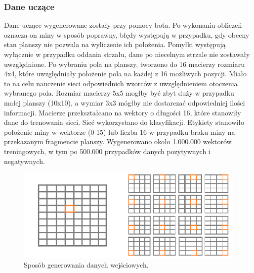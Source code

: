 \documentclass[letterpaper,12pt]{article} %
\begin{document}
\subsubsection*{Dane uczące}
Dane uczące wygenerowane zostały przy pomocy bota. Po wykonaniu obliczeń oznacza on miny w sposób poprawny, błędy występują w przypadku, gdy obecny stan planszy
nie pozwala na wyliczenie ich położenia. Pomyłki występują wyłącznie w przypadku oddania strzału, dane po niecelnym strzale nie zostawały uwzględnione. Po wybraniu pola na planszy, 
tworzono do 16 macierzy rozmiaru 4x4, które uwzględniały położenie pola na każdej z 16 możliwych pozycji. Miało to na celu nauczenie sieci odpowiednich wzorców z uwzględnieniem otoczenia wybranego
pola. Rozmiar macierzy 5x5 mogłby być zbyt duży w przypadku małej planszy (10x10), a wymiar 3x3 mógłby nie dostarczać odpowiedniej ilości informacji. Macierze przekształcano na wektory o długości
16, które stanowiły dane do trenowania sieci. Sieć wykorzystano do klasyfikacji. Etykiety stanowiło położenie miny w wektorze (0-15) lub liczba 16 w przypadku braku miny na przekazanym fragmencie planszy.
Wygenerowano około 1.000.000 wektorów treningowych, w tym po 500.000 przypadków danych pozytywnych i negatywnych.\\
\begin{figure}[h]
    \centering
    \includegraphics[scale=0.75]{generating.png}
    \caption{Sposób generowania danych wejściowych.}
\end{figure} \\
\end{document}
